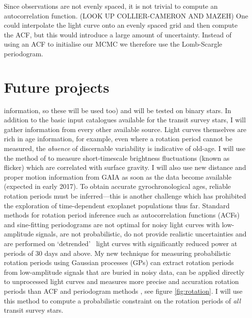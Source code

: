 Since \LSST observations are not evenly spaced, it is not trivial to compute
an autocorrelation function.
(LOOK UP COLLIER-CAMERON AND MAZEH)
One could interpolate the light curve onto an evenly spaced grid and then
compute the ACF, but this would introduce a large amount of uncertainty.
Instead of using an ACF to initialise our MCMC we therefore use the
Lomb-Scargle periodogram.

\subsection{\PLATO}

\section{Future projects}

information, so these will be used too) and will be tested on binary stars.
In addition to the basic input catalogues available for the transit survey
stars, I will gather information from every other available source.
Light curves themselves are rich in age information, for example, even where
a rotation period cannot be measured, the {\it absence} of discernable
variability is indicative of old-age.
I will use the method of \citet{bastien} to measure short-timescale brightness
fluctuations (known as flicker) which are correlated with surface gravity.
I will also use new distance and proper motion information from GAIA as soon as
the data become available (expected in early 2017).
To obtain accurate gyrochronological ages, reliable rotation periods must be
inferred---this is another challenge which has prohibited the exploration of
time-dependent exoplanet populations thus far.
Standard methods for rotation period inference such as autocorrelation
functions (ACFs) and sine-fitting periodograms are not optimal for noisy light
curves with low-amplitude signals, are not probabilistic, do not provide
realistic uncertainties and are performed on `detrended' \Kepler\ light curves
with significantly reduced power at periods of 30 days and above.
My new technique for measuring probabilistic rotation periods using Gaussian
processes (GPs) can extract rotation periods from low-amplitude signals that
are buried in noisy data, can be applied directly to unprocessed light curves
and measures more precise and accuration rotation periods than ACF and
periodogram methods \citep{AngusIAU}, see figure \ref{fig:rotation}.
I will use this method to compute a probabilistic constraint on the rotation
periods of {\it all} transit survey stars.


